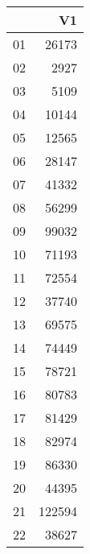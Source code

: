 \begin{table}[ht]
\centering
\begin{tabular}{rr}
  \hline
 & V1 \\ 
  \hline
01 & 26173 \\ 
  02 & 2927 \\ 
  03 & 5109 \\ 
  04 & 10144 \\ 
  05 & 12565 \\ 
  06 & 28147 \\ 
  07 & 41332 \\ 
  08 & 56299 \\ 
  09 & 99032 \\ 
  10 & 71193 \\ 
  11 & 72554 \\ 
  12 & 37740 \\ 
  13 & 69575 \\ 
  14 & 74449 \\ 
  15 & 78721 \\ 
  16 & 80783 \\ 
  17 & 81429 \\ 
  18 & 82974 \\ 
  19 & 86330 \\ 
  20 & 44395 \\ 
  21 & 122594 \\ 
  22 & 38627 \\ 
   \hline
\end{tabular}
\end{table}
